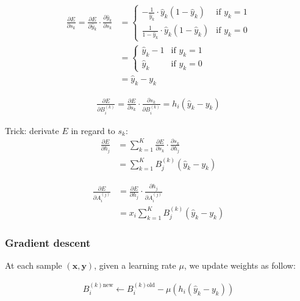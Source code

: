 \begin{align}
	\frac{ \partial E } { \partial s_k } 
		=  
		\frac{ \partial E } { \partial \hat y_k } \cdot \frac{ \partial \hat y_k } { \partial s_k } 
		&=
		\left\{
		    \begin{array}{ll}
		        - \frac{1}{\hat y_k} \cdot \hat y_k (1 - \hat y_k)& \mbox{if } y_k =1 \\
		        \frac{1}{1 - \hat y_k} \cdot \hat y_k (1 - \hat y_k)& \mbox{if } y_k =0
		    \end{array}
		\right. \\
		&=
		\left\{
		    \begin{array}{ll}
		       \hat y_k - 1 & \mbox{if } y_k =1 \\
		       \hat y_k & \mbox{if } y_k =0
		    \end{array}
		\right. \\
		&= \hat y_k - y_k
\end{align}



\begin{align}
	\frac{\partial E}{\partial B_i^{(k)}} 
	= 
	\frac{\partial E}{\partial s_k} \cdot \frac{\partial s_k}{\partial B_i^{(k)}} 
	= 
	h_i (\hat y_k - y_k)
\end{align}


Trick: derivate $E$ in regard to $s_k$:
\begin{align}
	\frac{\partial E}{\partial h_j} 
	&= 
	\sum_{k=1}^K \frac{\partial E}{\partial s_k} \cdot \frac{\partial s_k}{\partial h_j} \\
	&= 
	\sum_{k=1}^K B_j^{(k)} (\hat y_k - y_k)
\end{align}


\begin{align}
	\frac{\partial E}{\partial A_i^{(j)}} 
	&= 
	\frac{\partial E}{\partial h_j} \cdot \frac{\partial h_j}{\partial A_i^{(j)}} \\
	&= 
	x_i \sum_{k=1}^K B_j^{(k)} (\hat y_k - y_k)
\end{align}


\subsubsection*{Gradient descent}

At each sample $(\mathbf{x}, \mathbf{y})$, given a learning rate $\mu$, we update weights as follow:

\begin{align}
	B_i^{(k)\mbox{new}} \leftarrow B_i^{(k)\mbox{old}} - \mu (h_i (\hat y_k - y_k))
\end{align}

